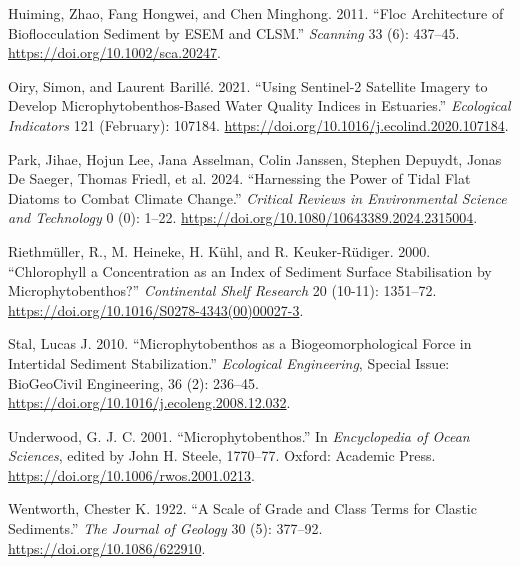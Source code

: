 \documentclass[
  letterpaper,
  DIV=11,
  numbers=noendperiod]{scrartcl}
\newlength{\cslhangindent}
\newenvironment{CSLReferences}[2] %
 {\begin{list}{}{%
  \setlength{\itemindent}{0pt}
  \setlength{\leftmargin}{0pt}
  \setlength{\parsep}{0pt}
  \ifodd #1
   \setlength{\leftmargin}{\cslhangindent}
   \setlength{\itemindent}{-1\cslhangindent}
  \fi
  \setlength{\itemsep}{#2\baselineskip}}}
 {\end{list}}
\begin{document}
\begin{CSLReferences}{1}{0}
Huiming, Zhao, Fang Hongwei, and Chen Minghong. 2011. {``Floc
Architecture of Bioflocculation Sediment by {ESEM} and {CLSM}.''}
\emph{Scanning} 33 (6): 437--45.
\url{https://doi.org/10.1002/sca.20247}.

Oiry, Simon, and Laurent Barillé. 2021. {``Using Sentinel-2 Satellite
Imagery to Develop Microphytobenthos-Based Water Quality Indices in
Estuaries.''} \emph{Ecological Indicators} 121 (February): 107184.
\url{https://doi.org/10.1016/j.ecolind.2020.107184}.

Park, Jihae, Hojun Lee, Jana Asselman, Colin Janssen, Stephen Depuydt,
Jonas De Saeger, Thomas Friedl, et al. 2024. {``Harnessing the Power of
Tidal Flat Diatoms to Combat Climate Change.''} \emph{Critical Reviews
in Environmental Science and Technology} 0 (0): 1--22.
\url{https://doi.org/10.1080/10643389.2024.2315004}.

Riethmüller, R., M. Heineke, H. Kühl, and R. Keuker-Rüdiger. 2000.
{``Chlorophyll a Concentration as an Index of Sediment Surface
Stabilisation by Microphytobenthos?''} \emph{Continental Shelf Research}
20 (10-11): 1351--72.
\url{https://doi.org/10.1016/S0278-4343(00)00027-3}.

Stal, Lucas J. 2010. {``Microphytobenthos as a Biogeomorphological Force
in Intertidal Sediment Stabilization.''} \emph{Ecological Engineering},
Special {Issue}: {BioGeoCivil} {Engineering}, 36 (2): 236--45.
\url{https://doi.org/10.1016/j.ecoleng.2008.12.032}.

Underwood, G. J. C. 2001. {``Microphytobenthos.''} In \emph{Encyclopedia
of {Ocean} {Sciences}}, edited by John H. Steele, 1770--77. Oxford:
Academic Press. \url{https://doi.org/10.1006/rwos.2001.0213}.

Wentworth, Chester K. 1922. {``A {Scale} of {Grade} and {Class} {Terms}
for {Clastic} {Sediments}.''} \emph{The Journal of Geology} 30 (5):
377--92. \url{https://doi.org/10.1086/622910}.

\end{CSLReferences}
\end{document}
